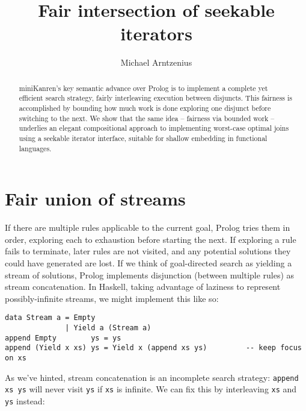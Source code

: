 \documentclass[acmsmall,screen,review,anonymous,dvipsnames,svgnames]{acmart}
\title{Fair intersection of seekable iterators}
\author{Michael Arntzenius}
\affiliation{%
	\institution{UC Berkeley}
	\city{Berkeley}
	\state{CA}
	\country{USA}
}
\newcommand\ttt\texttt
\begin{document}
\begin{abstract}
  {miniKanren}'s key semantic advance over Prolog is to implement a complete yet efficient search strategy, fairly interleaving execution between disjuncts.
  This fairness is accomplished by bounding how much work is done exploring one disjunct before switching to the next.
  We show that the same idea -- fairness via bounded work -- underlies an elegant compositional approach to implementing worst-case optimal joins using a seekable iterator interface, suitable for shallow embedding in functional languages.
\end{abstract}

\maketitle

\section{Fair union of streams}

If there are multiple rules applicable to the current goal, Prolog tries them in order, exploring each to exhaustion before starting the next.
If exploring a rule fails to terminate, later rules are not visited, and any potential solutions they could have generated are lost.
If we think of goal-directed search as yielding a stream of solutions, Prolog implements disjunction (between multiple rules) as stream concatenation.
In Haskell, taking advantage of laziness to represent possibly-infinite streams, we might implement this like so:

\begin{verbatim}
data Stream a = Empty
              | Yield a (Stream a)
append Empty        ys = ys
append (Yield x xs) ys = Yield x (append xs ys)         -- keep focus on xs
\end{verbatim}

\noindent
As we've hinted, stream concatenation is an incomplete search strategy: \ttt{append xs ys} will never visit \ttt{ys} if \ttt{xs} is infinite.
We can fix this by interleaving \ttt{xs} and \ttt{ys} instead:
\end{document}
